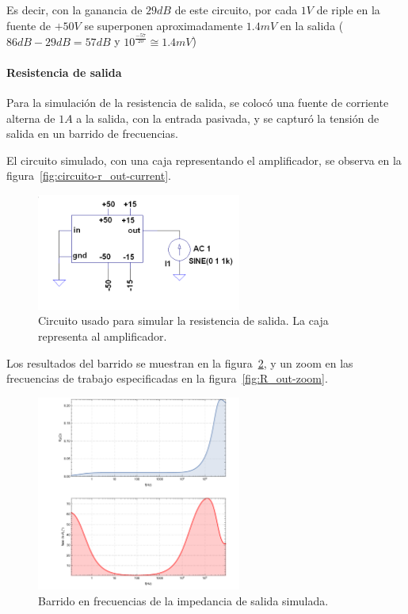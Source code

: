 \documentclass[a4paper,12pt,twoside]{article}
\begin{document}
Es decir, con la ganancia de $29dB$ de este circuito, por cada $1V$ de riple en la fuente de $+50V$ se superponen aproximadamente $1.4mV$ en la salida ($86dB-29dB=57dB$ y $10^\frac{-57}{20} \cong 1.4mV $)


\paragraph{Resistencia de salida}  

Para la simulación de la resistencia de salida, se colocó una fuente de corriente alterna de $1A$ a la salida, con la entrada pasivada, y se capturó la tensión de salida en un barrido de frecuencias.


El circuito simulado, con una caja representando el amplificador, se observa en la figura~\ref{fig:circuito-r_out-current}.


\begin{figure}[]
	\centering
	\includegraphics[width=0.6\textwidth]{img/sim/circuito-r_out-current}
	\caption{Circuito usado para simular la resistencia de salida. La caja representa al amplificador.}
	\label{fig:circuito_r-out-current}
\end{figure}

Los resultados del barrido se muestran en la figura~\ref{fig:R_out}, y un zoom en las frecuencias de trabajo especificadas en la figura~\ref{fig:R_out-zoom}.

\begin{figure}[]
	\centering
	\includegraphics[width=0.6\textwidth]{img/sim/R_out}
	\caption{Barrido en frecuencias de la impedancia de salida simulada.}
	\label{fig:R_out}
\end{figure}
\end{document}
